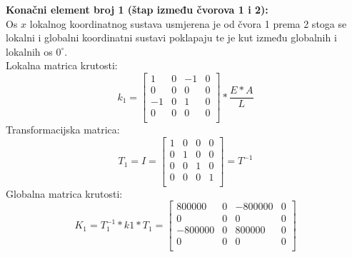 \documentclass[a4paper,twoside,12pt]{memoir} %
\begin{document}
\textbf{Konačni element broj 1 (štap između čvorova 1 i 2):} \\
Os $x$ lokalnog koordinatnog sustava usmjerena je od čvora 1 prema 2 stoga se lokalni i globalni koordinatni sustavi poklapaju te je kut između globalnih i lokalnih os $0^\circ$. \\
Lokalna matrica krutosti:
\begin{equation}
    k_1 = 
    \begin{bmatrix}
    1 & 0 & -1 & 0 \\
    0 & 0 & 0 & 0 \\
    -1 & 0 & 1 & 0 \\
    0 & 0 & 0 & 0 \\
    \end{bmatrix} * \frac{E * A}{L}
\end{equation}
Transformacijska matrica:
\begin{equation}
    T_1 = I =
    \begin{bmatrix}
    1 & 0 & 0 & 0 \\
    0 & 1 & 0 & 0 \\
    0 & 0 & 1 & 0 \\
    0 & 0 & 0 & 1 \\
    \end{bmatrix} = T^{-1}
\end{equation}
Globalna matrica krutosti:
\begin{equation}
    K_1 = T^{-1}_1 * k1 * T_1 =
    \begin{bmatrix}
    800000 & 0 & -800000 & 0 \\
    0 & 0 & 0 & 0 \\
    -800000 & 0 & 800000 & 0 \\
    0 & 0 & 0 & 0 \\
    \end{bmatrix}
\end{equation}
\end{document}
